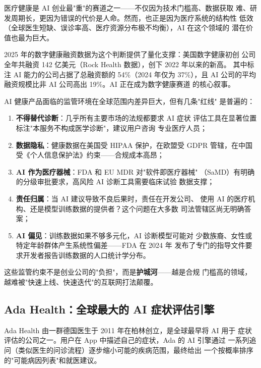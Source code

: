 医疗健康是 AI 创业最"重"的赛道之一——不仅因为技术门槛高、数据获取
难、研发周期长，更因为错误的代价是人命。然而，也正是因为医疗系统的结构性
低效（全球医生短缺、误诊率高、医疗资源分布极不均衡），AI 在这个领域的
潜在价值也最为巨大。

2025 年的数字健康融资数据为这个判断提供了量化支撑：美国数字健康初创
公司全年共融资 142 亿美元（Rock Health 数据），创下 2022 年以来的新高。
其中标注 AI 能力的公司占据了总融资额的 54\%（2024 年仅为 37\%），且
AI 公司的平均融资规模比非 AI 公司高出 19\%。AI 正在成为数字健康赛道
的核心叙事。

\begin{warnbox}[AI 医疗的监管红线]
AI 健康产品面临的监管环境在全球范围内差异巨大，但有几条"红线"
是普遍的：
\begin{enumerate}
  \item \textbf{不得替代诊断}：几乎所有主要市场的法规都要求 AI 症状
    评估工具在显著位置标注"本服务不构成医学诊断"，建议用户咨询
    专业医疗人员；
  \item \textbf{数据隐私}：健康数据在美国受 HIPAA 保护，在欧盟受 GDPR
    管辖，在中国受《个人信息保护法》约束——合规成本高昂；
  \item \textbf{AI 作为医疗器械}：FDA 和 EU MDR 对"软件即医疗器械"
    （SaMD）有明确的分级审批要求，高风险 AI 诊断工具需要临床试验
    数据支撑；
  \item \textbf{责任归属}：当 AI 建议导致不良后果时，责任在开发公司、
    使用 AI 的医疗机构、还是模型训练数据的提供者？这个问题在大多数
    司法管辖区尚无明确答案；
  \item \textbf{AI 偏见}：训练数据如果不够多元化，AI 诊断模型可能对
    少数族裔、女性或特定年龄群体产生系统性偏差——FDA 在 2024 年
    发布了专门的指导文件要求开发者报告训练数据的人口统计学分布。
\end{enumerate}
这些监管约束不是创业公司的"负担"，而是\textbf{护城河}——越是合规
门槛高的领域，越难被"快速上线、快速迭代"的互联网打法颠覆。
\end{warnbox}


\subsection{Ada Health：全球最大的 AI 症状评估引擎}
\label{subsec:ada-health}

Ada Health 由一群德国医生于 2011 年在柏林创立，是全球最早将 AI 用于
症状评估的公司之一。用户在 App 中描述自己的症状，Ada 的 AI 引擎通过
一系列追问（类似医生的问诊流程）逐步缩小可能的疾病范围，最终给出
一个按概率排序的"可能病因列表"和就医建议。

